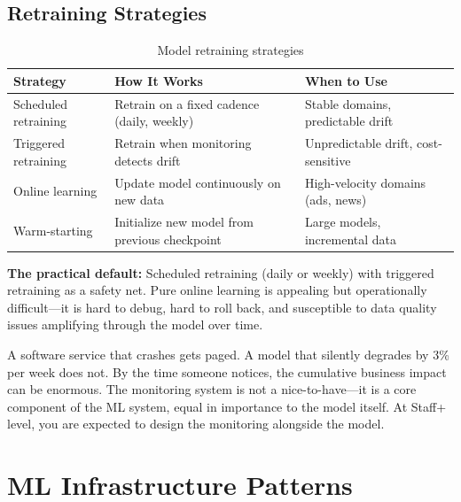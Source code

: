 \subsection{Retraining Strategies}

\begin{table}[H]
\centering
\caption{Model retraining strategies}
\begin{tabularx}{\textwidth}{lXX}
\toprule
\textbf{Strategy} & \textbf{How It Works} & \textbf{When to Use} \\
\midrule
Scheduled retraining & Retrain on a fixed cadence (daily, weekly) & Stable domains, predictable drift \\
Triggered retraining & Retrain when monitoring detects drift & Unpredictable drift, cost-sensitive \\
Online learning & Update model continuously on new data & High-velocity domains (ads, news) \\
Warm-starting & Initialize new model from previous checkpoint & Large models, incremental data \\
\bottomrule
\end{tabularx}
\end{table}

\textbf{The practical default:} Scheduled retraining (daily or weekly) with triggered retraining as a safety net. Pure online learning is appealing but operationally difficult---it is hard to debug, hard to roll back, and susceptible to data quality issues amplifying through the model over time.

\begin{keyinsight}
A software service that crashes gets paged. A model that silently degrades by 3\% per week does not. By the time someone notices, the cumulative business impact can be enormous. The monitoring system is not a nice-to-have---it is a core component of the ML system, equal in importance to the model itself. At Staff+ level, you are expected to design the monitoring alongside the model.
\end{keyinsight}

\section{ML Infrastructure Patterns}
\label{sec:ml_infra}

